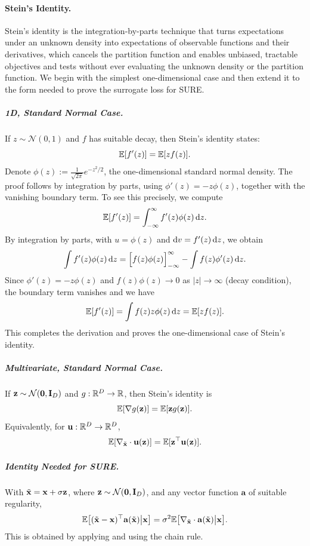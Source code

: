 \paragraph{Stein's Identity.} Stein’s identity is the integration-by-parts technique that turns expectations under an unknown density  into expectations of observable functions and their derivatives, which cancels the partition function and enables unbiased, tractable objectives and tests without ever evaluating the unknown density or the partition function. We begin with the simplest one-dimensional case and then extend it to the form needed to prove the surrogate loss for SURE.
\subparagraph{1D, Standard Normal Case.}
If $z \sim \mathcal{N}(0,1)$ and $f$ has suitable decay, then Stein's identity states:
\[
\mathbb{E}[f'(z)]  =  \mathbb{E}[z f(z)] .
\]
Denote $\phi(z) := \tfrac{1}{\sqrt{2\pi}}  e^{-z^2/2}$, the one-dimensional standard normal density.
The proof follows by integration by parts, using $\phi'(z) = -z\phi(z)$, together with the vanishing boundary term. 
To see this precisely, we compute
\[
\mathbb{E}[f'(z)] 
= \int_{-\infty}^{\infty} f'(z)  \phi(z)  \mathop{}\!\mathrm{d} z.
\]
By integration by parts, with $u=\phi(z)$ and $\mathop{}\!\mathrm{d} v=f'(z)  \mathop{}\!\mathrm{d} z$, we obtain
\[
\int f'(z)  \phi(z)  \mathop{}\!\mathrm{d} z
= \Big[ f(z)  \phi(z) \Big]_{-\infty}^{\infty}
- \int f(z)  \phi'(z)  \mathop{}\!\mathrm{d} z.
\]
Since $\phi'(z) = -z\phi(z)$ and $f(z)\phi(z)\to 0$ as $|z|\to\infty$ (decay condition), the boundary term vanishes and we have
\[
\mathbb{E}[f'(z)]  =  \int f(z)  z  \phi(z)  \mathop{}\!\mathrm{d} z  =  \mathbb{E}[z f(z)].
\]
This completes the derivation and proves the one-dimensional case of Stein's identity.


\subparagraph{Multivariate, Standard Normal Case.}
If ${\mathbf{z}} \sim \mathcal{N}(\mathbf{0},{\mathbf{I}}_D)$ and $g:\mathbb{R}^D \to \mathbb{R}$, then Stein's identity is
\[
\mathbb{E}[\nabla g({\mathbf{z}})]  =  \mathbb{E}[{\mathbf{z}} g({\mathbf{z}})].
\]
Equivalently, for $\mathbf{u}:\mathbb{R}^D \to \mathbb{R}^D$,
\begin{align}\label{eq:stein-multi}
    \mathbb{E}[ \nabla_{\tilde{{\mathbf{x}}}} \cdot\mathbf{u}({\mathbf{z}})]  =  \mathbb{E}[{\mathbf{z}}^\top \mathbf{u}({\mathbf{z}})] .
\end{align}


\subparagraph{Identity Needed for SURE.}
With $\tilde{{\mathbf{x}}}={\mathbf{x}}+\sigma{\mathbf{z}}$, where ${\mathbf{z}} \sim \mathcal{N}(\mathbf{0},{\mathbf{I}}_D)$, and any vector function $\mathbf{a}$ of suitable regularity,
\begin{align}\label{eq:stein-for-sure}
    \mathbb{E}\big[(\tilde{{\mathbf{x}}}-{\mathbf{x}})^\top \mathbf{a}(\tilde{{\mathbf{x}}})  \big|  {\mathbf{x}}\big]
 =  \sigma^2 \mathbb{E}\big[ \nabla_{\tilde{{\mathbf{x}}}} \cdot\mathbf{a}(\tilde{{\mathbf{x}}})  \big|  {\mathbf{x}}\big]. 
\end{align}
This is obtained by applying  and using the chain rule.

